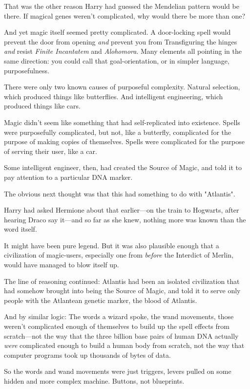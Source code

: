 That was the other reason Harry had guessed the Mendelian pattern would be 
there. If magical genes weren't complicated, why would there be more than one?

And yet magic itself seemed pretty complicated. A door-locking spell would 
prevent the door from opening \emph{and} prevent you from Transfiguring the 
hinges \emph{and} resist \emph{Finite Incantatem} and \emph{Alohomora}. Many 
elements all pointing in the same direction: you could call that 
goal-orientation, or in simpler language, purposefulness.

There were only two known causes of purposeful complexity. Natural selection, 
which produced things like butterflies. And intelligent engineering, which 
produced things like cars.

Magic didn't seem like something that had self-replicated into existence. 
Spells were purposefully complicated, but not, like a butterfly, complicated 
for the purpose of making copies of themselves. Spells were complicated for the 
purpose of serving their user, like a car.

Some intelligent engineer, then, had created the Source of Magic, and told it 
to pay attention to a particular DNA marker.

The obvious next thought was that this had something to do with "Atlantis".

Harry had asked Hermione about that earlier---on the train to Hogwarts, after 
hearing Draco say it---and so far as she knew, nothing more was known than the 
word itself.

It might have been pure legend. But it was also plausible enough that a 
civilization of magic-users, especially one from \emph{before} the Interdict of 
Merlin, would have managed to blow itself up.

The line of reasoning continued: Atlantis had been an isolated civilization 
that had somehow brought into being the Source of Magic, and told it to serve 
only people with the Atlantean genetic marker, the blood of Atlantis.

And by similar logic: The words a wizard spoke, the wand movements, those 
weren't complicated enough of themselves to build up the spell effects from 
scratch---not the way that the three billion base pairs of human DNA actually 
\emph{were} complicated enough to build a human body from scratch, not the way 
that computer programs took up thousands of bytes of data.

So the words and wand movements were just triggers, levers pulled on some 
hidden and more complex machine. Buttons, not blueprints.

